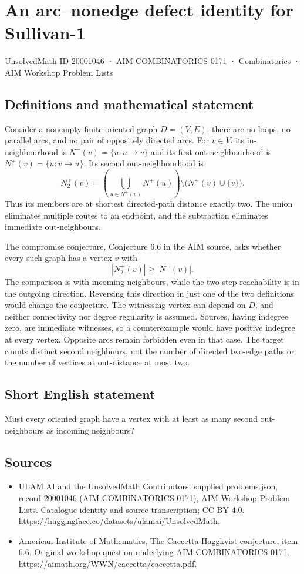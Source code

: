 \documentclass[11pt,a4paper]{article}
\begin{document}
\section*{An arc--nonedge defect identity for Sullivan-1}\label{20001046}
{\small UnsolvedMath ID 20001046 · AIM-COMBINATORICS-0171 · Combinatorics · AIM Workshop Problem Lists}
\subsection{Definitions and mathematical statement}
Consider a nonempty finite oriented graph $D=(V,E)$: there are no
loops, no parallel arcs, and no pair of oppositely directed arcs.
For $v\in V$, its in-neighbourhood is $N^-(v)=\{u:u\to v\}$ and
its first out-neighbourhood is $N^+(v)=\{u:v\to u\}$.
Its second out-neighbourhood is
\[
 N_2^+(v)=\left(\bigcup_{u\in N^+(v)}N^+(u)\right)
                         \setminus\bigl(N^+(v)\cup\{v\}\bigr).
\]
Thus its members are at shortest directed-path distance exactly two.
The union eliminates multiple routes to an endpoint, and the
subtraction eliminates immediate out-neighbours.

The compromise conjecture, Conjecture 6.6 in the AIM source, asks
whether every such graph has a vertex $v$ with
\[
                              |N_2^+(v)|\ge |N^-(v)|.
\]
The comparison is with incoming neighbours, while the two-step
reachability is in the outgoing direction. Reversing this direction
in just one of the two definitions would change the conjecture.
The witnessing vertex can depend on $D$, and neither connectivity
nor degree regularity is assumed. Sources, having indegree zero,
are immediate witnesses, so a counterexample would have positive
indegree at every vertex. Opposite arcs remain forbidden even in
that case. The target counts distinct second neighbours, not the
number of directed two-edge paths or the number of vertices at
out-distance at most two.
\subsection{Short English statement}
Must every oriented graph have a vertex with at least as many second out-neighbours as incoming neighbours?
\subsection{Sources}
\begin{itemize}
\item[S1] ULAM.AI and the UnsolvedMath Contributors, supplied problems.json, record 20001046 (AIM-COMBINATORICS-0171), AIM Workshop Problem Lists. Catalogue identity and source transcription; CC BY 4.0.
\url{https://huggingface.co/datasets/ulamai/UnsolvedMath}.
\item[S2] American Institute of Mathematics, The Caccetta-Haggkvist conjecture, item 6.6. Original workshop question underlying AIM-COMBINATORICS-0171.
\url{https://aimath.org/WWN/caccetta/caccetta.pdf}.
\end{itemize}
\end{document}
